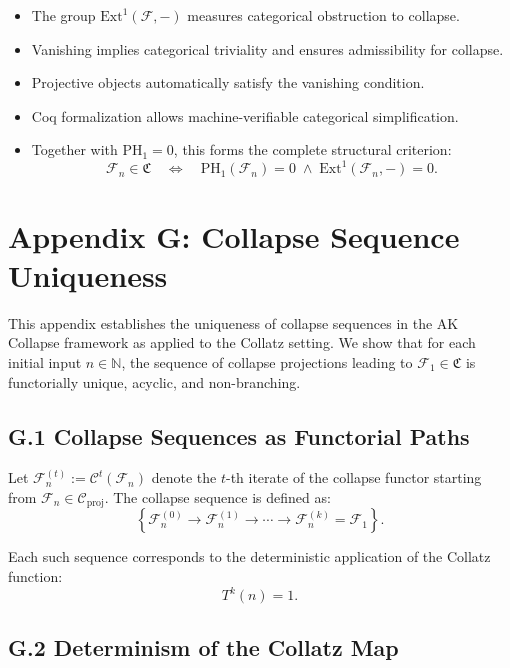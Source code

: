 \documentclass[11pt]{article}
\begin{document}
\begin{itemize}
  \item The group \( \mathrm{Ext}^1(\mathcal{F}, -) \) measures categorical obstruction to collapse.
  \item Vanishing implies categorical triviality and ensures admissibility for collapse.
  \item Projective objects automatically satisfy the vanishing condition.
  \item Coq formalization allows machine-verifiable categorical simplification.
  \item Together with \( \mathrm{PH}_1 = 0 \), this forms the complete structural criterion:
  \[
  \mathcal{F}_n \in \mathfrak{C} \quad \Leftrightarrow \quad \mathrm{PH}_1(\mathcal{F}_n) = 0 \;\wedge\; \mathrm{Ext}^1(\mathcal{F}_n, -) = 0.
  \]
\end{itemize}



\appendix
\section*{Appendix G: Collapse Sequence Uniqueness}

This appendix establishes the uniqueness of collapse sequences in the AK Collapse framework as applied to the Collatz setting. We show that for each initial input \( n \in \mathbb{N} \), the sequence of collapse projections leading to \( \mathcal{F}_1 \in \mathfrak{C} \) is functorially unique, acyclic, and non-branching.

\subsection*{G.1 Collapse Sequences as Functorial Paths}

Let \( \mathcal{F}_n^{(t)} := \mathcal{C}^t(\mathcal{F}_n) \) denote the \( t \)-th iterate of the collapse functor starting from \( \mathcal{F}_n \in \mathcal{C}_{\mathrm{proj}} \). The collapse sequence is defined as:
\[
\left\{ \mathcal{F}_n^{(0)} \to \mathcal{F}_n^{(1)} \to \cdots \to \mathcal{F}_n^{(k)} = \mathcal{F}_1 \right\}.
\]

Each such sequence corresponds to the deterministic application of the Collatz function:
\[
T^k(n) = 1.
\]

\subsection*{G.2 Determinism of the Collatz Map}
\end{document}
